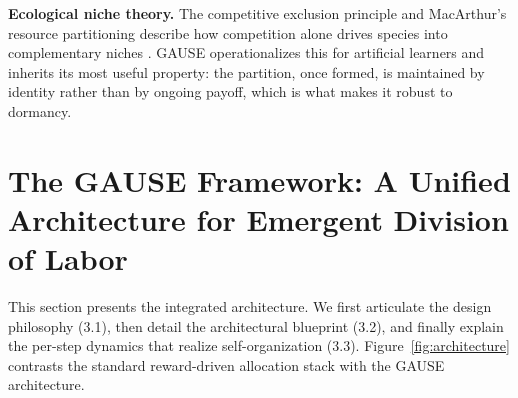 \documentclass[10pt]{article}
\begin{document}
\textbf{Ecological niche theory.} The competitive exclusion principle
\cite{gause1934struggle, hardin1960competitive} and MacArthur's resource
partitioning \cite{macarthur1958population} describe how competition alone
drives species into complementary niches \cite{grant2014finches}.
GAUSE operationalizes this for artificial learners and inherits its
most useful property: the partition, once formed, is maintained by identity
rather than by ongoing payoff, which is what makes it robust to dormancy.

\section{The GAUSE Framework: A Unified Architecture for
Emergent Division of Labor}

This section presents the integrated architecture. We first articulate the
design philosophy (3.1), then detail the architectural blueprint (3.2), and
finally explain the per-step dynamics that realize self-organization (3.3).
Figure~\ref{fig:architecture} contrasts the standard reward-driven allocation
stack with the GAUSE architecture.
\end{document}
